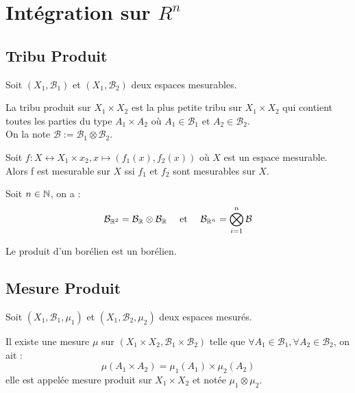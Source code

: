

\section{Intégration sur $R^n$}

\subsection{Tribu Produit}

Soit $(X_1,\mathcal{B}_1)$ et $(X_1,\mathcal{B}_2)$ deux espaces mesurables. 

\begin{definition}
    La tribu produit sur $X_1 \times X_2$ est la plus petite tribu sur $X_1 \times X_2$ qui contient toutes les 
    parties du type $A_1 \times A_2$ où $A_1 \in \mathcal{B}_1$ et $A_2 \in \mathcal{B}_2$. \\
    On la note $ \mathcal{B} := \mathcal{B}_1 \otimes \mathcal{B}_2$. 
\end{definition}

\begin{prop}
    Soit $f : X \longleftrightarrow X_1 \times x_2, x \longmapsto (f_1(x),f_2(x))$ où $X$ est un espace mesurable. \\
    Alors f est mesurable sur $X$ ssi $f_1$ et $f_2$ sont mesurables sur $X$. 
\end{prop}

\begin{theorem}
    Soit $n \in \mathbb{N}$, on a :
    \[ \mathcal{B}_{\mathbb{R}^2} = \mathcal{B}_{\mathbb{R}} \otimes \mathcal{B}_{\mathbb{R}} \quad \text{ et } \quad \mathcal{B}_{\mathbb{R}^n} = \bigotimes_{i=1}^n \mathcal{B} \] 
\end{theorem}

\begin{corollary}
    Le produit d'un borélien est un borélien. 
\end{corollary}

\subsection{Mesure Produit}

Soit $(X_1,\mathcal{B}_1,\mu_1)$ et $(X_1,\mathcal{B}_2,\mu_2)$ deux espaces mesurés. 

\begin{definition}
    Il existe une mesure $\mu$ sur $(X_1 \times X_2, \mathcal{B}_1 \times \mathcal{B}_2)$ telle que 
    $ \forall A_1 \in \mathcal{B}_1, \forall A_2 \in \mathcal{B}_2$, on ait :
        \[ \mu (A_1 \times A_2) = \mu_1(A_1) \times \mu_2(A_2) \]
    elle est appelée mesure produit sur $X_1 \times X_2$ et notée $\mu_1 \otimes \mu_2$. 
\end{definition}


